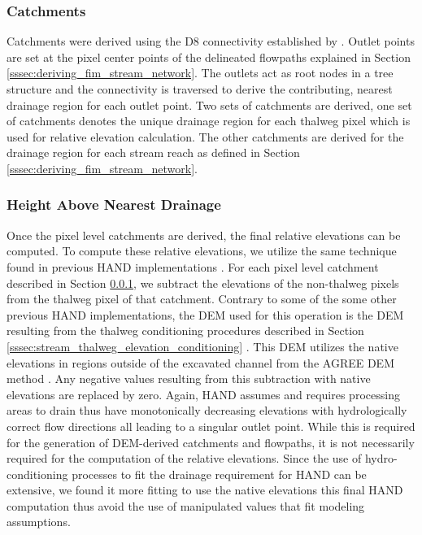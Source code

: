 \subsubsection{Catchments}
\label{sssec:catchments}
%
Catchments were derived using the D8 connectivity established by .
Outlet points are set at the pixel center points of the delineated flowpaths explained in Section \ref{sssec:deriving_fim_stream_network}.
The outlets act as root nodes in a tree structure and the connectivity is traversed to derive the contributing, nearest drainage region for each outlet point.
Two sets of catchments are derived, one set of catchments denotes the unique drainage region for each thalweg pixel which is used for relative elevation calculation.
The other catchments are derived for the drainage region for each stream reach as defined in Section \ref{sssec:deriving_fim_stream_network}. 
%
\subsubsection{Height Above Nearest Drainage}
\label{sssec:hand}
%
Once the pixel level catchments are derived, the final relative elevations can be computed.
To compute these relative elevations, we utilize the same technique found in previous HAND implementations \cite{zheng2018geoflood,zheng2018river,nobre2011height,nobre2016hand,maidment2017conceptual,garousi2019terrain}.
For each pixel level catchment described in Section \ref{sssec:catchments}, we subtract the elevations of the non-thalweg pixels from the thalweg pixel of that catchment.
Contrary to some of the some other previous HAND implementations, the DEM used for this operation is the DEM resulting from the thalweg conditioning procedures described in Section \ref{sssec:stream_thalweg_elevation_conditioning} \cite{djokic2019arc}.
This DEM utilizes the native elevations in regions outside of the excavated channel from the AGREE DEM method \cite{djokic2019arc}.
Any negative values resulting from this subtraction with native elevations are replaced by zero.
Again, HAND assumes and requires processing areas to drain thus have monotonically decreasing elevations with hydrologically correct flow directions all leading to a singular outlet point.
While this is required for the generation of DEM-derived catchments and flowpaths, it is not necessarily required for the computation of the relative elevations.
Since the use of hydro-conditioning processes to fit the drainage requirement for HAND can be extensive, we found it more fitting to use the native elevations this final HAND computation thus avoid the use of manipulated values that fit modeling assumptions.
%
